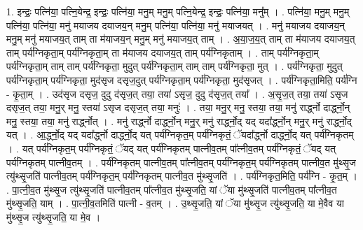 \documentclass[17pt]{extarticle}
\begin{document}
1. इन्द्रः॒ पत्नि॑या॒ पत्नि॒येन्द्र॒ इन्द्रः॒ पत्नि॑या॒ मनु॒म् मनु॒म् पत्नि॒येन्द्र॒ इन्द्रः॒ पत्नि॑या॒ मनु᳚म् । . पत्नि॑या॒ मनु॒म् मनु॒म् पत्नि॑या॒ पत्नि॑या॒ मनु॑ मयाजय दयाजय॒न् मनु॒म् पत्नि॑या॒ पत्नि॑या॒ मनु॑ मयाजयत् । . मनु॑ मयाजय दयाजय॒न् मनु॒म् मनु॑ मयाजय॒त् ताम् ता म॑याजय॒न् मनु॒म् मनु॑ मयाजय॒त् ताम् । . अ॒या॒ज॒य॒त् ताम् ता म॑याजय दयाजय॒त् ताम् पर्य॑ग्निकृता॒म् पर्य॑ग्निकृता॒म् ता म॑याजय दयाजय॒त् ताम् पर्य॑ग्निकृताम् । . ताम् पर्य॑ग्निकृता॒म् पर्य॑ग्निकृता॒म् ताम् ताम् पर्य॑ग्निकृता॒ मुदुत् पर्य॑ग्निकृता॒म् ताम् ताम् पर्य॑ग्निकृता॒ मुत् । . पर्य॑ग्निकृता॒ मुदुत् पर्य॑ग्निकृता॒म् पर्य॑ग्निकृता॒ मुद॑सृज दसृज॒दुत् पर्य॑ग्निकृता॒म् पर्य॑ग्निकृता॒ मुद॑सृजत् । . पर्य॑ग्निकृता॒मिति॒ पर्य॑ग्नि - कृ॒ता॒म् । . उद॑सृज दसृज॒ दुदु द॑सृज॒त् तया॒ तया॑ ऽसृज॒ दुदु द॑सृज॒त् तया᳚ । . अ॒सृ॒ज॒त् तया॒ तया॑ ऽसृज दसृज॒त् तया॒ मनु॒र् मनु॒ स्तया॑ ऽसृज दसृज॒त् तया॒ मनुः॑ । . तया॒ मनु॒र् मनु॒ स्तया॒ तया॒ मनु॑ रार्द्ध्नो दार्द्ध्नो॒न् मनु॒ स्तया॒ तया॒ मनु॑ रार्द्ध्नोत् । . मनु॑ रार्द्ध्नो दार्द्ध्नो॒न् मनु॒र् मनु॑ रार्द्ध्नो॒द् यद् यदा᳚र्द्ध्नो॒न् मनु॒र् मनु॑ रार्द्ध्नो॒द् यत् । . आ॒र्द्ध्नो॒द् यद् यदा᳚र्द्ध्नो दार्द्ध्नो॒द् यत् पर्य॑ग्निकृत॒म् पर्य॑ग्निकृतं॒ ॅयदा᳚र्द्ध्नो दार्द्ध्नो॒द् यत् पर्य॑ग्निकृतम् । . यत् पर्य॑ग्निकृत॒म् पर्य॑ग्निकृतं॒ ॅयद् यत् पर्य॑ग्निकृतम् पात्नीव॒तम् पा᳚त्नीव॒तम् पर्य॑ग्निकृतं॒ ॅयद् यत् पर्य॑ग्निकृतम् पात्नीव॒तम् । . पर्य॑ग्निकृतम् पात्नीव॒तम् पा᳚त्नीव॒तम् पर्य॑ग्निकृत॒म् पर्य॑ग्निकृतम् पात्नीव॒त मु॑थ्सृ॒ज त्यु॑थ्सृ॒जति॑ पात्नीव॒तम् पर्य॑ग्निकृत॒म् पर्य॑ग्निकृतम् पात्नीव॒त मु॑थ्सृ॒जति॑ । . पर्य॑ग्निकृत॒मिति॒ पर्य॑ग्नि - कृ॒त॒म् । . पा॒त्नी॒व॒त मु॑थ्सृ॒ज त्यु॑थ्सृ॒जति॑ पात्नीव॒तम् पा᳚त्नीव॒त मु॑थ्सृ॒जति॒ यां ॅया मु॑थ्सृ॒जति॑ पात्नीव॒तम् पा᳚त्नीव॒त मु॑थ्सृ॒जति॒ याम् । . पा॒त्नी॒व॒तमिति॑ पात्नी - व॒तम् । . उ॒थ्सृ॒जति॒ यां ॅया मु॑थ्सृ॒ज त्यु॑थ्सृ॒जति॒ या मे॒वैव या मु॑थ्सृ॒ज त्यु॑थ्सृ॒जति॒ या मे॒व । \newline
\end{document}
